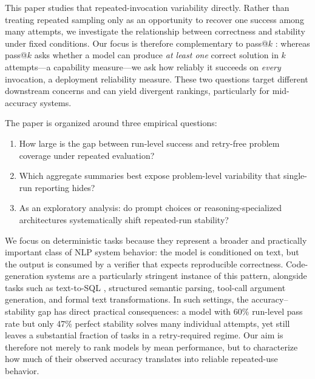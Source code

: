 \documentclass[11pt]{article}
\begin{document}
This paper studies that repeated-invocation variability directly. Rather than treating repeated sampling only as an opportunity to recover one success among many attempts, we investigate the relationship between correctness and stability under fixed conditions. Our focus is therefore complementary to pass@$k$ \cite{chen2021codex}: whereas pass@$k$ asks whether a model can produce \emph{at least one} correct solution in $k$ attempts---a capability measure---we ask how reliably it succeeds on \emph{every} invocation, a deployment reliability measure. These two questions target different downstream concerns and can yield divergent rankings, particularly for mid-accuracy systems.

The paper is organized around three empirical questions:
\begin{enumerate}
  \item How large is the gap between run-level success and retry-free problem coverage under repeated evaluation?
  \item Which aggregate summaries best expose problem-level variability that single-run reporting hides?
  \item As an exploratory analysis: do prompt choices or reasoning-specialized architectures systematically shift repeated-run stability?
\end{enumerate}

We focus on deterministic tasks because they represent a broader and practically important class of NLP system behavior: the model is conditioned on text, but the output is consumed by a verifier that expects reproducible correctness. Code-generation systems are a particularly stringent instance of this pattern, alongside tasks such as text-to-SQL \cite{gao2023text}, structured semantic parsing, tool-call argument generation, and formal text transformations. In such settings, the accuracy--stability gap has direct practical consequences: a model with 60\% run-level pass rate but only 47\% perfect stability solves many individual attempts, yet still leaves a substantial fraction of tasks in a retry-required regime. Our aim is therefore not merely to rank models by mean performance, but to characterize how much of their observed accuracy translates into reliable repeated-use behavior.
\end{document}
